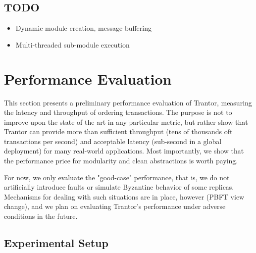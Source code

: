 \documentclass{article}
\begin{document}
\subsubsection{}
\subsubsection{}
\subsubsection{}

\subsection{TODO}

\begin{itemize}
    \item Dynamic module creation, message buffering
    \item Multi-threaded sub-module execution
\end{itemize}

\section{Performance Evaluation}
\label{sec:evaluation}

This section presents a preliminary performance evaluation of Trantor, measuring the latency and throughput of ordering transactions.
The purpose is not to improve upon the state of the art in any particular metric,
but rather show that Trantor can provide more than sufficient throughput (tens of thousands oft transactions per second)
and acceptable latency (sub-second in a global deployment) for many real-world applications.
Most importantly, we show that the performance price for modularity and clean abstractions is worth paying.

For now, we only evaluate the "good-case" performance, that is, we do not artificially introduce faults or simulate Byzantine behavior of some replicas.
Mechanisms for dealing with such situations are in place, however (PBFT view change),
and we plan on evaluating Trantor's performance under adverse conditions in the future.

\subsection{Experimental Setup}
\end{document}
